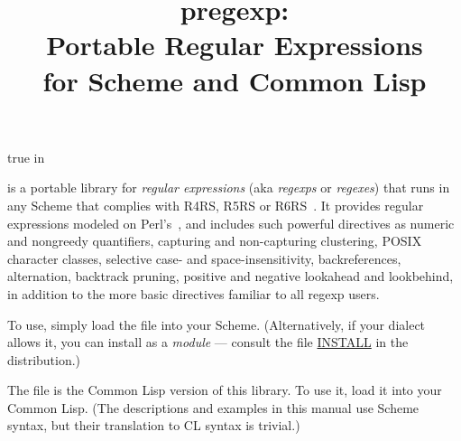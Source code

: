 


\let\TZPtexlayout 0

 true in

\ifx\shipout\UNDEFINED

\let\PRIMsection\section
\def\section{\htmlpagebreak\PRIMsection}
\fi
\let\c\centerline
\let\n\noindent
\let\f\numberedfootnote

\def\meta[#1]{{\em #1}}

\title{pregexp: \\
Portable Regular Expressions \\
for Scheme and Common Lisp}

\ifx\shipout\UnDeFiNeD
\c{}
\fi

\c{}

\bigskip

\n {} is a portable library for {\em
regular expressions} (aka {\em regexps} or {\em
regexes}) that runs in any Scheme
that complies with R4RS, R5RS or R6RS~\cite{r6rs}.  It
provides regular expressions
modeled on
Perl's~\cite{friedl:regex,pperl}, and includes such
powerful directives as numeric and nongreedy
quantifiers, capturing and non-capturing clustering,
POSIX character classes, selective case- and
space-insensitivity, backreferences, alternation,
backtrack pruning,
positive and negative lookahead and lookbehind, in
addition to the more basic directives familiar to all
regexp users.

To use, simply load the file  into
your Scheme.
(Alternatively, if your dialect allows it, you can
install  as a {\em module} --- consult
the file \url{INSTALL} in the distribution.)

The file  is the Common Lisp version
of this library.  To use it, load it into your Common Lisp.
(The descriptions and examples in this manual use Scheme
syntax, but their
translation to CL syntax is trivial.)

\htmlonly

\n{\bf Contents}

\tableofcontents
\endhtmlonly


